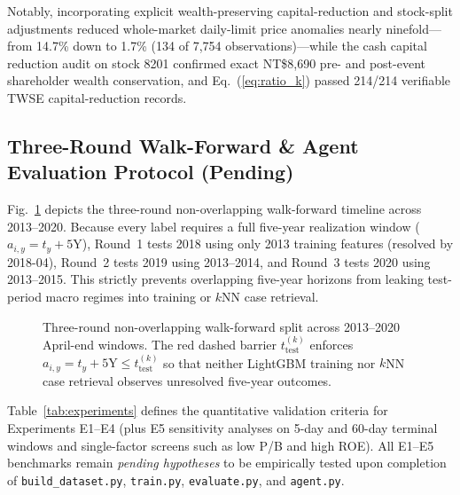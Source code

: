 \documentclass[conference]{IEEEtran}
\begin{document}
Notably, incorporating explicit wealth-preserving capital-reduction and stock-split adjustments reduced whole-market daily-limit price anomalies nearly ninefold---from 14.7\% down to 1.7\% (134 of 7,754 observations)---while the cash capital reduction audit on stock 8201 confirmed exact NT\$8,690 pre- and post-event shareholder wealth conservation, and Eq.~(\ref{eq:ratio_k}) passed 214/214 verifiable TWSE capital-reduction records.

\subsection{Three-Round Walk-Forward & Agent Evaluation Protocol (Pending)}
Fig.~\ref{fig:walkforward} depicts the three-round non-overlapping walk-forward timeline across 2013--2020. Because every label requires a full five-year realization window ($a_{i,y} = t_y + 5\text{Y}$), Round~1 tests 2018 using only 2013 training features (resolved by 2018-04), Round~2 tests 2019 using 2013--2014, and Round~3 tests 2020 using 2013--2015. This strictly prevents overlapping five-year horizons from leaking test-period macro regimes into training or $k$NN case retrieval.

\begin{figure}[t]
\centering
\resizebox{\textwidth}{!}{}
\caption{Three-round non-overlapping walk-forward split across 2013--2020 April-end windows. The red dashed barrier $t_{\text{test}}^{(k)}$ enforces $a_{i,y} = t_y + 5\text{Y} \le t_{\text{test}}^{(k)}$ so that neither LightGBM training nor $k$NN case retrieval observes unresolved five-year outcomes.}
\label{fig:walkforward}
\end{figure}

Table~\ref{tab:experiments} defines the quantitative validation criteria for Experiments E1--E4 (plus E5 sensitivity analyses on 5-day and 60-day terminal windows and single-factor screens such as low P/B and high ROE). All E1--E5 benchmarks remain \emph{pending hypotheses} to be empirically tested upon completion of \texttt{build\_dataset.py}, \texttt{train.py}, \texttt{evaluate.py}, and \texttt{agent.py}.
\end{document}
